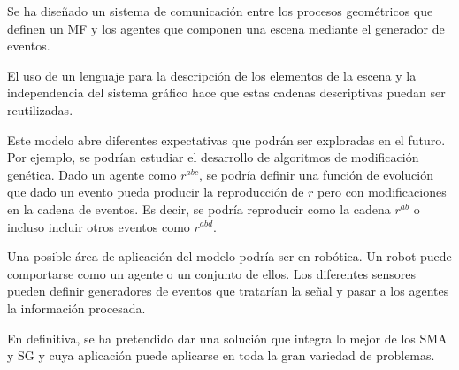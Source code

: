 \documentclass[runningheads]{llncs}
\begin{document}
Se ha dise\~nado un sistema de comunicaci\'on entre los procesos geom\'etricos que definen un MF y los agentes que componen una escena mediante el generador de eventos.

El uso de un lenguaje para la descripci\'on de los elementos de la escena y la independencia del sistema gr\'afico hace que estas cadenas descriptivas puedan ser reutilizadas.

	Este modelo abre diferentes expectativas que podr\'an ser exploradas en el futuro. Por ejemplo, se podr\'ian estudiar el desarrollo de algoritmos de modificaci\'on gen\'etica. Dado un agente como $r^{abc}$, se podr\'ia definir una funci\'on de evoluci\'on que dado un evento pueda producir la reproducci\'on de $r$ pero con modificaciones en la cadena de eventos. Es decir, se podr\'ia reproducir como la cadena $r^{ab}$ o incluso incluir otros eventos como $r^{abd}$.
	
	Una posible \'area de aplicaci\'on del modelo podr\'ia ser en rob\'otica. Un robot puede comportarse como un agente o un conjunto de ellos. Los diferentes sensores pueden definir generadores de eventos que tratar\'ian la se\~{n}al y pasar a los agentes la informaci\'on procesada.
	
En definitiva, se ha pretendido dar una soluci\'on que integra lo mejor de los SMA y SG y cuya aplicaci\'on puede aplicarse en toda la gran variedad de problemas.
\end{document}
